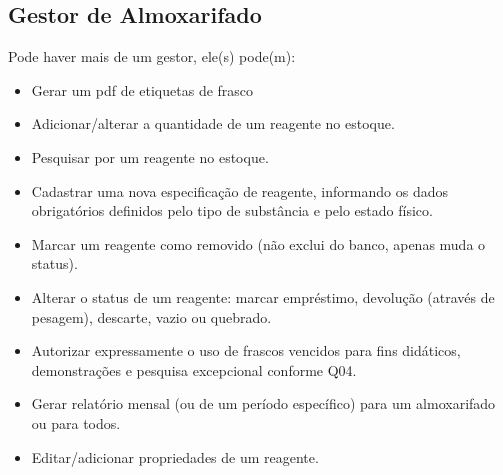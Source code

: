 \subsection{Gestor de Almoxarifado}
Pode haver mais de um gestor, ele(s) pode(m):
\begin{itemize}
    \item Gerar um pdf de etiquetas de frasco 
    \item Adicionar/alterar a quantidade de um reagente no estoque.
    \item Pesquisar por um reagente no estoque.
    \item Cadastrar uma nova especificação de reagente, informando os dados obrigatórios definidos pelo tipo de substância e pelo estado físico.
    \item Marcar um reagente como removido (não exclui do banco, apenas muda o status).
    \item Alterar o status de um reagente: marcar empréstimo, devolução (através de pesagem), descarte, vazio ou quebrado.
    \item Autorizar expressamente o uso de frascos vencidos para fins didáticos, demonstrações e pesquisa excepcional conforme Q04.
    \item Gerar relatório mensal (ou de um período específico) para um almoxarifado ou para todos.
    \item Editar/adicionar propriedades de um reagente.
\end{itemize}

